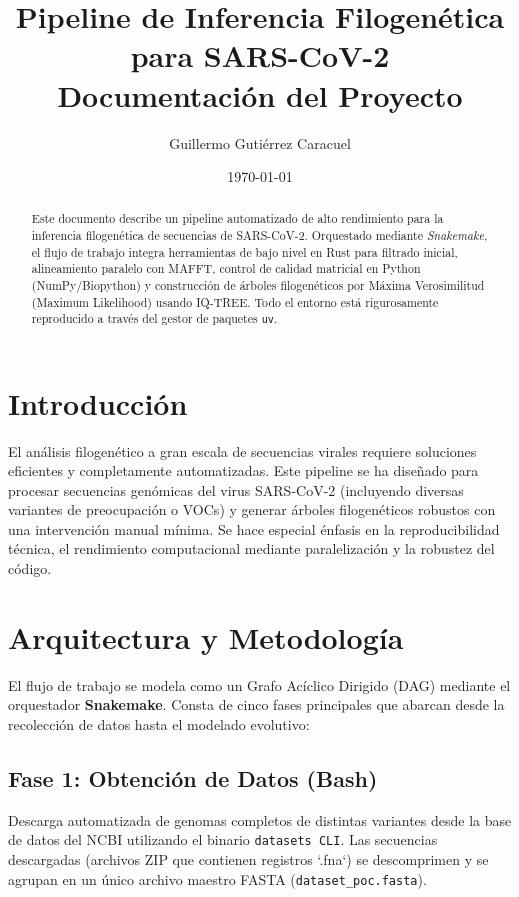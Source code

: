 \documentclass[12pt,a4paper]{article}
\title{\textbf{Pipeline de Inferencia Filogenética para SARS-CoV-2}\\
\large Documentación del Proyecto}
\author{Guillermo Gutiérrez Caracuel}
\date{\today}
\begin{document}
\maketitle

\begin{abstract}
    Este documento describe un pipeline automatizado de alto rendimiento para la inferencia filogenética de secuencias de SARS-CoV-2. Orquestado mediante \textit{Snakemake}, el flujo de trabajo integra herramientas de bajo nivel en Rust para filtrado inicial, alineamiento paralelo con MAFFT, control de calidad matricial en Python (NumPy/Biopython) y construcción de árboles filogenéticos por Máxima Verosimilitud (Maximum Likelihood) usando IQ-TREE. Todo el entorno está rigurosamente reproducido a través del gestor de paquetes \texttt{uv}.
\end{abstract}

\section{Introducción}
El análisis filogenético a gran escala de secuencias virales requiere soluciones eficientes y completamente automatizadas. Este pipeline se ha diseñado para procesar secuencias genómicas del virus SARS-CoV-2 (incluyendo diversas variantes de preocupación o VOCs) y generar árboles filogenéticos robustos con una intervención manual mínima. Se hace especial énfasis en la reproducibilidad técnica, el rendimiento computacional mediante paralelización y la robustez del código.

\section{Arquitectura y Metodología}
El flujo de trabajo se modela como un Grafo Acíclico Dirigido (DAG) mediante el orquestador \textbf{Snakemake}. Consta de cinco fases principales que abarcan desde la recolección de datos hasta el modelado evolutivo:

\subsection{Fase 1: Obtención de Datos (Bash)}
Descarga automatizada de genomas completos de distintas variantes desde la base de datos del NCBI utilizando el binario \texttt{datasets CLI}. Las secuencias descargadas (archivos ZIP que contienen registros `.fna`) se descomprimen y se agrupan en un único archivo maestro FASTA (\texttt{dataset\_poc.fasta}).
\end{document}
